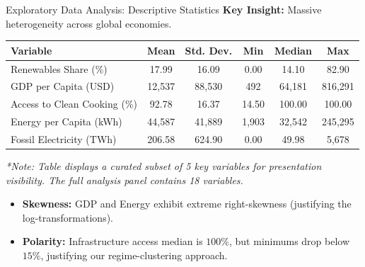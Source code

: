 \documentclass[aspectratio=169]{beamer}
\begin{document}
\begin{frame}{Exploratory Data Analysis: Descriptive Statistics}
  \textbf{Key Insight:} Massive heterogeneity across global economies.
  
  \begin{table}[]
      \centering
      \footnotesize %
      \begin{tabular}{l c c c c c}
      \toprule
      \textbf{Variable} & \textbf{Mean} & \textbf{Std. Dev.} & \textbf{Min} & \textbf{Median} & \textbf{Max} \\
      \midrule
      Renewables Share (\%) & 17.99 & 16.09 & 0.00 & 14.10 & 82.90 \\
      GDP per Capita (USD) & 12,537 & 88,530 & 492 & 64,181 & 816,291 \\
      Access to Clean Cooking (\%) & 92.78 & 16.37 & 14.50 & 100.00 & 100.00 \\
      Energy per Capita (kWh) & 44,587 & 41,889 & 1,903 & 32,542 & 245,295 \\
      Fossil Electricity (TWh) & 206.58 & 624.90 & 0.00 & 49.98 & 5,678 \\
      \bottomrule
      \end{tabular}
  \end{table}
  \vspace{-0.2cm} %
  {\tiny \textit{*Note: Table displays a curated subset of 5 key variables for presentation visibility. The full analysis panel contains 18 variables.}}\par
  
  \vspace{0.2cm}
  \begin{itemize}
      \small %
      \item \textbf{Skewness:} GDP and Energy exhibit extreme right-skewness (justifying the log-transformations).
      \item \textbf{Polarity:} Infrastructure access median is $100\%$, but minimums drop below $15\%$, justifying our regime-clustering approach.
  \end{itemize}
\end{frame}
\end{document}

